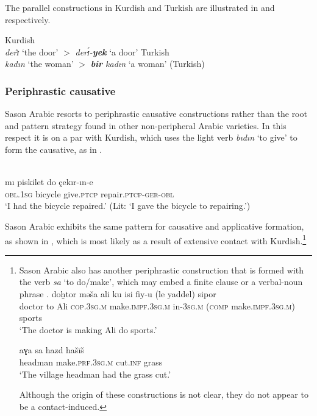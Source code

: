 \documentclass[output=paper]{langsci/langscibook}
\begin{document}
\noindent The parallel constructions in Kurdish and Turkish are illustrated in  and  respectively.

\begin{exe}
\ex \label{defkr} Kurdish\\	\textit{derɪ}̂ `the door' 	$>$ \textit{derɪ́-\textbf{yek}} `a door'
\ex \label{deftk} Turkish\\	\textit{kadın} `the woman' $>$ \textit{\textbf{bir} kadın} `a woman' (Turkish)
\end{exe}

 
\subsubsection{Periphrastic causative}

Sason Arabic resorts to periphrastic causative constructions rather than the root and pattern strategy found in other non-peripheral Arabic varieties. In this respect it is on a par with Kurdish, which uses the light verb \textit{bıdın} ‘to give’ to form the causative, as in . 

\begin{exe}
\ex \label{perrk}
\\
\gll  	mı         piskilet      	   do      	çekır-ın-e	\\
        \textsc{obl.1sg} bicycle  give.\textsc{ptcp}   repair.\textsc{ptcp-ger-obl}	 \\
        \glt `I had the bicycle repaired.' (Lit: `I gave the bicycle to repairing.')
\end{exe}
										
Sason Arabic exhibits the same pattern for causative and applicative formation, as shown in , which is most likely as a result of extensive contact with Kurdish.\footnote{Sason Arabic also has another periphrastic construction that is formed with the verb \textit{sa} `to do/make', which may embed a finite clause  or a verbal-noun phrase . 
\ea \label{make} 
\ea 
\label{makefin}  \gll doḫtor mə\v{s}a ali ku isi fiy-u (le yaddel) sipor \\
		doctor to Ali \textsc{cop.3sg.m} make.\textsc{impf.3sg.m} in-\textsc{3sg.m} (\textsc{comp} make.\textsc{impf.3sg.m}) sports\\\glt `The doctor is making Ali do sports.' 
	
		\ex \label{makeinf} \gll aɣa sa hazd ha\v{s}ī\v{s}\\
		headman make.\textsc{prf.3sg.m} cut.\textsc{inf} grass  \\
		\glt 	`The village headman had the grass cut.'
\z
\z

\noindent Although the origin of these constructions is not clear, they do not appear to be a contact-induced.}
\end{document}
